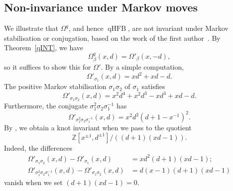 \documentclass[11pt]{amsart}
\numberwithin{equation}{section}
\numberwithin{figure}{section}
\theoremstyle{definition}
\newcommand{\bZ}{\mathbb{Z}}
\DeclareMathOperator{\qHFB}{qHFB}
\begin{document}
\subsection{Non-invariance under Markov moves}
We illustrate that $\Omega^q$, and hence $\qHFB$, are not invariant under Markov stabilisation or conjugation, based on the work of the first author~\cite{Anghel2024AIF}. By Theorem~\ref{qINT}, we have
\[
\Omega^q_\beta(x,d) = \Omega'_\beta(x,-d),
\]
so it suffices to show this for $\Omega'$. By a simple computation,
\[
\Omega'_{\sigma_1}(x,d) = xd^2 + xd - d.
\]
The positive Markov stabilisation $\sigma_1\sigma_2$ of $\sigma_1$ satisfies
\[
\Omega'_{\sigma_1\sigma_2}(x,d) = x^2d^4 + x^2d^3 - xd^3 + xd - d.
\]
Furthermore, the conjugate $\sigma_1^2\sigma_2\sigma_1^{-1}$ has
\[
\Omega'_{\sigma_1^2\sigma_2\sigma_1^{-1}}(x,d) = x^2d^2(d+1-x^{-1})^2.
\]
By \cite[Theorem~1.6]{Anghel2024AIF}, we obtain a knot invariant when we pass to the quotient 
\[
\bZ[x^{\pm 1}, d^{\pm 1}]/((d+1)(xd-1)). 
\]
Indeed, the differences
\[
\begin{split}
\Omega'_{\sigma_1\sigma_2}(x,d) - \Omega'_{\sigma_1}(x,d) &= xd^2(d+1)(xd-1); \\
\Omega'_{\sigma_1^2\sigma_2\sigma_1^{-1}}(x,d) - \Omega'_{\sigma_1\sigma_2}(x,d) &= d(x-1)(d+1)(xd-1)
\end{split}
\]
vanish when we set $(d+1)(xd-1) = 0$.



\end{document}
